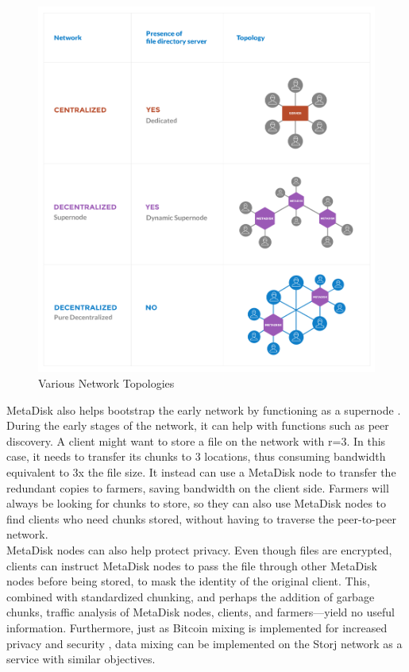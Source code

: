 \documentclass[a4paper,10pt]{article}
\begin{document}
\begin{figure}[h!]
\centering
\includegraphics[width=\linewidth]{7}
\caption{Various Network Topologies \cite{9}}
\end{figure}
MetaDisk also helps bootstrap the early network by functioning as a supernode \cite{9}. During the early stages of the network, it can help with functions such as peer discovery. A client might want to store a file on the network with r=3. In this case, it needs to transfer its chunks to 3 locations, thus consuming bandwidth equivalent to 3x the file size. It instead can use a MetaDisk node to transfer the redundant copies to farmers, saving bandwidth on the client side. Farmers will always be looking for chunks to store, so they can also use MetaDisk nodes to find clients who need chunks stored, without having to traverse the peer-to-peer network.  \\

MetaDisk nodes can also help protect privacy. Even though files are encrypted, clients can instruct MetaDisk nodes to pass the file through other MetaDisk nodes before being stored, to mask the identity of the original client. This, combined with standardized chunking, and perhaps the addition of garbage chunks, traffic analysis of MetaDisk nodes, clients, and farmers—yield no useful information. Furthermore, just as Bitcoin mixing is implemented for increased privacy and security \cite{10}, data mixing can be implemented on the Storj network as a service with similar objectives. \\
\end{document}
